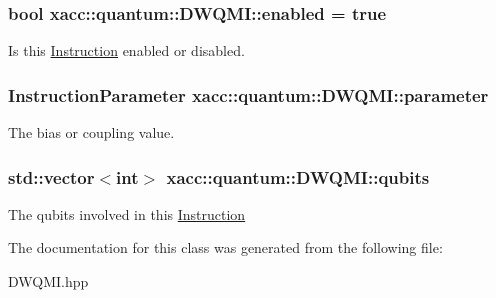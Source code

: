 \subsubsection[{\texorpdfstring{enabled}{enabled}}]{\setlength{\rightskip}{0pt plus 5cm}bool xacc\+::quantum\+::\+D\+W\+Q\+M\+I\+::enabled = true\hspace{0.3cm}{\ttfamily [protected]}}\hypertarget{a00046_ae06f0e1952dea7381cbae3cd3954de1f}{}\label{a00046_ae06f0e1952dea7381cbae3cd3954de1f}
Is this \hyperlink{a00072}{Instruction} enabled or disabled. 
\subsubsection[{\texorpdfstring{parameter}{parameter}}]{\setlength{\rightskip}{0pt plus 5cm}Instruction\+Parameter xacc\+::quantum\+::\+D\+W\+Q\+M\+I\+::parameter\hspace{0.3cm}{\ttfamily [protected]}}\hypertarget{a00046_a30249f83412fb56f7c8be9ec0ad726a9}{}\label{a00046_a30249f83412fb56f7c8be9ec0ad726a9}
The bias or coupling value. 
\subsubsection[{\texorpdfstring{qubits}{qubits}}]{\setlength{\rightskip}{0pt plus 5cm}std\+::vector$<$int$>$ xacc\+::quantum\+::\+D\+W\+Q\+M\+I\+::qubits\hspace{0.3cm}{\ttfamily [protected]}}\hypertarget{a00046_a5fc6e587225f365b150ef58fc7d2ed32}{}\label{a00046_a5fc6e587225f365b150ef58fc7d2ed32}
The qubits involved in this \hyperlink{a00072}{Instruction} 

The documentation for this class was generated from the following file\+:\begin{DoxyCompactItemize}
\item 
D\+W\+Q\+M\+I.\+hpp\end{DoxyCompactItemize}
